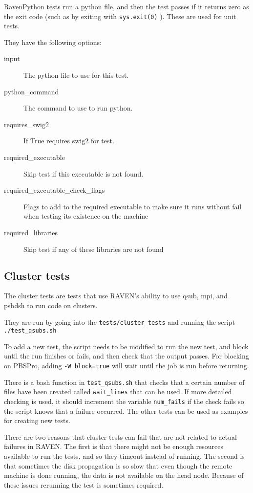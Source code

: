 \documentclass{article}
\begin{document}
RavenPython tests run a python file, and then the test passes if it
returns zero as the exit code (such as by exiting with
\verb'sys.exit(0)' ).  These are used for unit tests.

They have the following options:

\begin{description}
\item[input] The python file to use for this test.
\item[python\_command] The command to use to run python.
\item[requires\_swig2] If True requires swig2 for test.
\item[required\_executable] Skip test if this executable is not found.
\item[required\_executable\_check\_flags] Flags to add to the required executable to make sure it runs without fail when testing its existence on the machine
\item[required\_libraries] Skip test if any of these libraries are not found
\end{description}

\subsection{Cluster tests}


The cluster tests are tests that use RAVEN's ability to use qsub, mpi,
and psbdsh to run code on clusters.

They are run by going into the \verb'tests/cluster_tests' and running
the script \verb'./test_qsubs.sh'

To add a new test, the script needs to be modified to run the new
test, and block until the run finishes or fails, and then check that
the output passes.  For blocking on PBSPro, adding
\verb'-W block=true' will wait until the job is run before returning.

There is a bash function in \verb'test_qsubs.sh' that checks that a
certain number of files have been created called \verb'wait_lines'
that can be used.  If more detailed checking is used, it should
increment the variable \verb'num_fails' if the check fails so the
script knows that a failure occurred.  The other tests can be used as
examples for creating new tests.

There are two reasons that cluster tests can fail that are not related
to actual failures in RAVEN.  The first is that there might not be
enough resources available to run the tests, and so they timeout
instead of running.  The second is that sometimes the disk propagation
is so slow that even though the remote machine is done running, the
data is not available on the head node.  Because of these issues
rerunning the test is sometimes required.
\end{document}
